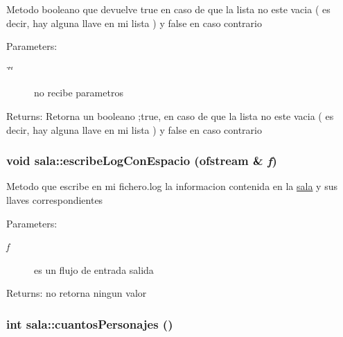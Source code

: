 Metodo booleano que devuelve true en caso de que la lista no este vacia ( es decir, hay alguna llave en mi lista ) y false en caso contrario \begin{Desc}
\item[Parameters:]
\begin{description}
\item[{\em \char`\"{}\char`\"{}}]no recibe parametros \end{description}
\end{Desc}
\begin{Desc}
\item[Returns:]Retorna un booleano ;true, en caso de que la lista no este vacia ( es decir, hay alguna llave en mi lista ) y false en caso contrario \end{Desc}
\hypertarget{classsala_f02e9b4d4608076a48e51f2c4ddf87d4}{
\subsubsection[escribeLogConEspacio]{\setlength{\rightskip}{0pt plus 5cm}void sala::escribeLogConEspacio (ofstream \& {\em f})}}
\label{classsala_f02e9b4d4608076a48e51f2c4ddf87d4}


Metodo que escribe en mi fichero.log la informacion contenida en la \hyperlink{classsala}{sala} y sus llaves correspondientes \begin{Desc}
\item[Parameters:]
\begin{description}
\item[{\em f}]es un flujo de entrada salida \end{description}
\end{Desc}
\begin{Desc}
\item[Returns:]no retorna ningun valor \end{Desc}
\hypertarget{classsala_096e4d5f4a0389e546d97167c3c24f81}{
\subsubsection[cuantosPersonajes]{\setlength{\rightskip}{0pt plus 5cm}int sala::cuantosPersonajes ()}}
\label{classsala_096e4d5f4a0389e546d97167c3c24f81}


